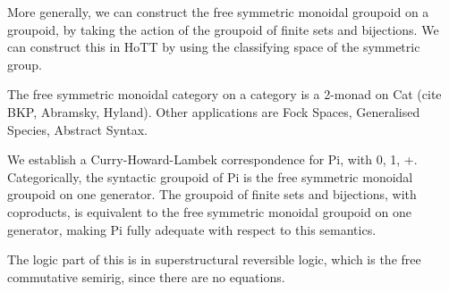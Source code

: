 More generally, we can construct the free symmetric monoidal groupoid on a groupoid, by taking the action of the
groupoid of finite sets and bijections. We can construct this in HoTT by using the classifying space of the symmetric
group.

The free symmetric monoidal category on a category is a 2-monad on Cat (cite BKP, Abramsky, Hyland). Other applications
are Fock Spaces, Generalised Species, Abstract Syntax.

We establish a Curry-Howard-Lambek correspondence for Pi, with 0, 1, +. Categorically, the syntactic groupoid of Pi is
the free symmetric monoidal groupoid on one generator. The groupoid of finite sets and bijections, with coproducts, is
equivalent to the free symmetric monoidal groupoid on one generator, making Pi fully adequate with respect to this
semantics.

The logic part of this is in superstructural reversible logic, which is the free commutative semirig, since there are no
equations.

